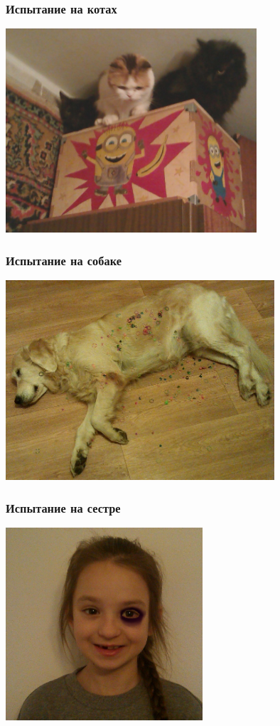 \begin{frame}
    \frametitle{Испытание на котах}
    
    \begin{center}
        \includegraphics[width=0.7\textwidth]{fig/cats}
    \end{center}
\end{frame}

\begin{frame}
    \frametitle{Испытание на собаке}
    
    \begin{center}
        \includegraphics[width=0.75\textwidth]{fig/dog}
    \end{center}
\end{frame}

\begin{frame}
    \frametitle{Испытание на сестре}
    
    \begin{center}
        \includegraphics[width=0.55\textwidth]{fig/nastyaWork}
    \end{center}
\end{frame}

